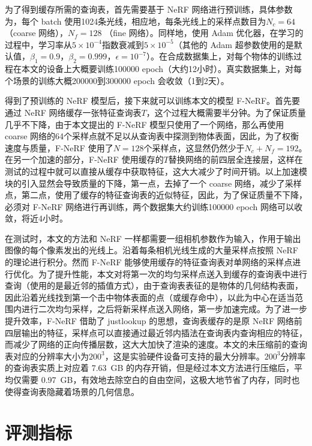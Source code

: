 为了得到缓存所需的查询表，首先需要基于 NeRF 网络进行预训练，具体参数为，每个 batch 使用1024条光线，相应地，每条光线上的采样点数目为$N_c = 64$（coarse 网络），$N_f = 128$ （fine 网络）。同样地，使用 Adam 优化器\cite{kingma2014adam}，在学习的过程中，学习率从$5 \times 10^{-4}$指数衰减到$5 \times 10^{-5}$（其他的 Adam 超参数使用的是默认值，$\beta_{1} = 0.9$，$\beta_{2} = 0.999$，$\epsilon = 10^{-7}$）。在合成数据集上，对每个物体的训练过程在本文的设备上大概要训练100000 epoch（大约12小时）。真实数据集上，对每个场景的训练大概200000到300000 epoch 会收敛（1到2天）。

得到了预训练的 NeRF 模型后，接下来就可以训练本文的模型 F-NeRF。首先要通过 NeRF 网络缓存一张特征查询表$T$，这个过程大概需要半分钟。为了保证质量几乎不下降，由于本文提出的 F-NeRF 模型只使用了一个网络，那么再使用 coarse 网络的64个采样点就不足以从查询表中探测到物体表面，因此，为了权衡速度与质量，F-NeRF 使用了$N = 128$个采样点，这显然仍然少于$N_c + N_f = 192$。在另一个加速的部分，F-NeRF 使用缓存的$T$替换网络的前四层全连接层，这样在测试的过程中就可以直接从缓存中获取特征，这大大减少了时间开销。以上加速模块的引入显然会导致质量的下降，第一点，去掉了一个 coarse 网络，减少了采样点，第二点，使用了缓存的特征查询表的近似特征，因此，为了保证质量不下降，必须对 F-NeRF 网络进行再训练，两个数据集大约训练100000 epoch 网络可以收敛，将近4小时。

在测试时，本文的方法和 NeRF 一样都需要一组相机参数作为输入，作用于输出图像的每个像素发出的光线上。沿着每条相机光线生成的大量采样点按照 NeRF 的理论进行积分。然而 F-NeRF 能够使用缓存的特征查询表对单网络的采样点进行优化。为了提升性能，本文对将第一次的均匀采样点送入到缓存的查询表中进行查询（使用的是最近邻的插值方式），由于查询表表征的是物体的几何结构表面，因此沿着光线找到第一个击中物体表面的点（或缓存命中），以此为中心在适当范围内进行二次均匀采样，之后将新采样点送入网络，第一步加速完成。为了进一步提升效率，F-NeRF 借助了 justlookup \cite{lin2019justlookup}的思想，查询表缓存的是原 NeRF 网络前四层输出的特征，采样点可以直接通过最近邻内插法在查询表内查询相应的特征，而减少了网络的正向传播层数，这大大加快了渲染的速度。本文的未压缩前的查询表对应的分辨率大小为$200^3$，这是实验硬件设备可支持的最大分辨率。$200^3$分辨率的查询表实质上对应着 \SI{7.63}{GB} 的内存开销，但是经过本文方法进行压缩后，平均仅需要 \SI{0.97}{GB}，有效地去除空白的自由空间，这极大地节省了内存，同时也使得查询表隐藏着场景的几何信息。

\section{评测指标}\label{metrics}
